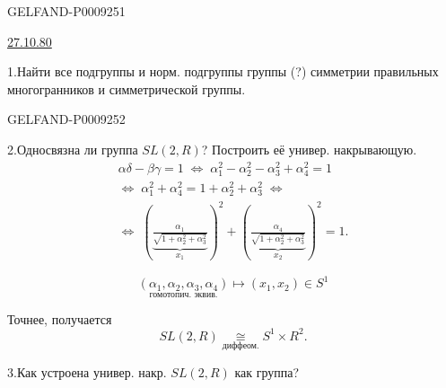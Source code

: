 \begin{GelfandAdjacentEvidence}{GELFAND-P000925}{1}

\underline{27.10.80}\qquad{}


1.\enspace Найти все подгруппы и норм. подгруппы группы (?) симметрии правильных многогранников и симметрической группы.
\end{GelfandAdjacentEvidence}
\begin{GelfandAdjacentEvidence}{GELFAND-P000925}{2}


2.\enspace Односвязна ли группа $SL(2,R)$? Построить её универ. накрывающую.
\begin{gather*}
 \alpha\delta-\beta\gamma=1
 \;\Longleftrightarrow\;
 \alpha_1^2-\alpha_2^2-\alpha_3^2+\alpha_4^2=1\\
 \Longleftrightarrow\;
 \alpha_1^2+\alpha_4^2=1+\alpha_2^2+\alpha_3^2
 \;\Longleftrightarrow\\
 \Longleftrightarrow\;
 \left(\underbrace{\frac{\alpha_1}{\sqrt{1+\alpha_2^2+\alpha_3^2}}}_{x_1}\right)^2+
 \left(\underbrace{\frac{\alpha_4}{\sqrt{1+\alpha_2^2+\alpha_3^2}}}_{x_2}\right)^2=1.
\end{gather*}
\end{GelfandAdjacentEvidence}


\[
 \underset{\text{гомотопич. эквив.}}{(\alpha_1,\alpha_2,\alpha_3,\alpha_4)}
 \longmapsto (x_1,x_2)\in S^1
\]

Точнее, получается
\[
 SL(2,R)\underset{\text{диффеом.}}{\cong} S^1\times R^2.
\]

3.\enspace Как устроена универ. накр. $SL(2,R)$ как группа?


